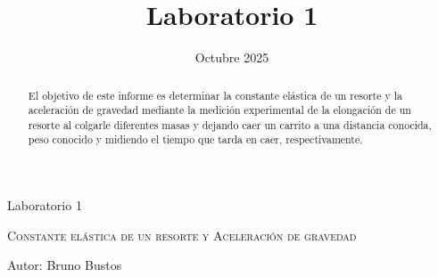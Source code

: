\documentclass{article}
\title{Laboratorio 1}
\date{Octubre 2025}
\begin{document}
\fancyfoot[C]{}          
\fancyhead{}    

\begin{center}
\large Laboratorio 1 \\
\vspace{0.3cm}
{\scshape\Huge  Constante elástica de un resorte y Aceleración de gravedad \par}
\vspace{0.5cm}
\vspace{1.5cm}
{\large Autor: Bruno Bustos}
\vspace{0.3cm}
\large 
\\ 
\end{center}
\vspace{1cm}

\begin{abstract}

    El objetivo de este informe es determinar la constante elástica de un resorte y la aceleración
    de gravedad mediante la medición experimental de la elongación de un resorte al colgarle diferentes
    masas y dejando caer un carrito a una distancia conocida, peso conocido y midiendo el tiempo que
    tarda en caer, respectivamente.

\end{abstract}
\end{document}
